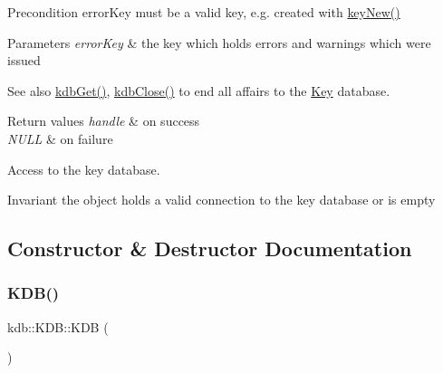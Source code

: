 \begin{DoxyPrecond}{Precondition}
error\+Key must be a valid key, e.\+g. created with \mbox{\hyperlink{group__key_gad23c65b44bf48d773759e1f9a4d43b89}{key\+New()}}
\end{DoxyPrecond}

\begin{DoxyParams}{Parameters}
{\em error\+Key} & the key which holds errors and warnings which were issued \\
\hline
\end{DoxyParams}
\begin{DoxySeeAlso}{See also}
\mbox{\hyperlink{group__kdb_ga28e385fd9cb7ccfe0b2f1ed2f62453a1}{kdb\+Get()}}, \mbox{\hyperlink{group__kdb_gadb54dc9fda17ee07deb9444df745c96f}{kdb\+Close()}} to end all affairs to the \mbox{\hyperlink{group__key}{Key}} database. 
\end{DoxySeeAlso}

\begin{DoxyRetVals}{Return values}
{\em handle} & on success \\
\hline
{\em N\+U\+LL} & on failure\\
\hline
\end{DoxyRetVals}
Access to the key database.

\begin{DoxyInvariant}{Invariant}
the object holds a valid connection to the key database or is empty 
\end{DoxyInvariant}


\subsection{Constructor \& Destructor Documentation}
\mbox{\label{classkdb_1_1KDB_a7e0637995ce9f294cdbc6f167df6db40}} 
\subsubsection{\texorpdfstring{KDB()}{KDB()}\hspace{0.1cm}{\footnotesize\ttfamily [1/2]}}
{\footnotesize\ttfamily kdb\+::\+K\+D\+B\+::\+K\+DB (\begin{DoxyParamCaption}{ }\end{DoxyParamCaption})\hspace{0.3cm}{\ttfamily [inline]}}



